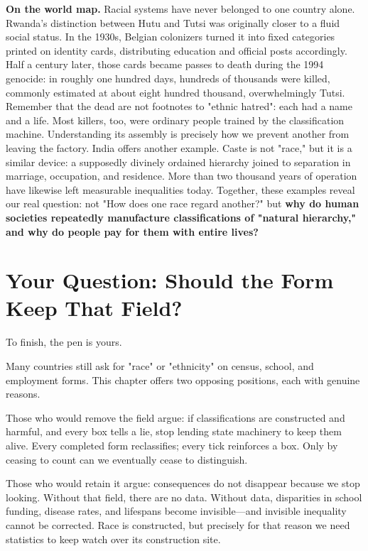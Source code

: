 \textbf{On the world map.} Racial systems have never belonged to one country alone. Rwanda's distinction between Hutu and Tutsi was originally closer to a fluid social status. In the 1930s, Belgian colonizers turned it into fixed categories printed on identity cards, distributing education and official posts accordingly. Half a century later, those cards became passes to death during the 1994 genocide: in roughly one hundred days, hundreds of thousands were killed, commonly estimated at about eight hundred thousand, overwhelmingly Tutsi. Remember that the dead are not footnotes to "ethnic hatred": each had a name and a life. Most killers, too, were ordinary people trained by the classification machine. Understanding its assembly is precisely how we prevent another from leaving the factory. India offers another example. Caste is not "race," but it is a similar device: a supposedly divinely ordained hierarchy joined to separation in marriage, occupation, and residence. More than two thousand years of operation have likewise left measurable inequalities today. Together, these examples reveal our real question: not "How does one race regard another?" but \textbf{why do human societies repeatedly manufacture classifications of "natural hierarchy," and why do people pay for them with entire lives?}

\section[Should the Form Keep That Field?]{Your Question: Should the Form Keep That Field?}
To finish, the pen is yours.

Many countries still ask for "race" or "ethnicity" on census, school, and employment forms. This chapter offers two opposing positions, each with genuine reasons.

Those who would remove the field argue: if classifications are constructed and harmful, and every box tells a lie, stop lending state machinery to keep them alive. Every completed form reclassifies; every tick reinforces a box. Only by ceasing to count can we eventually cease to distinguish.

Those who would retain it argue: consequences do not disappear because we stop looking. Without that field, there are no data. Without data, disparities in school funding, disease rates, and lifespans become invisible---and invisible inequality cannot be corrected. Race is constructed, but precisely for that reason we need statistics to keep watch over its construction site.

